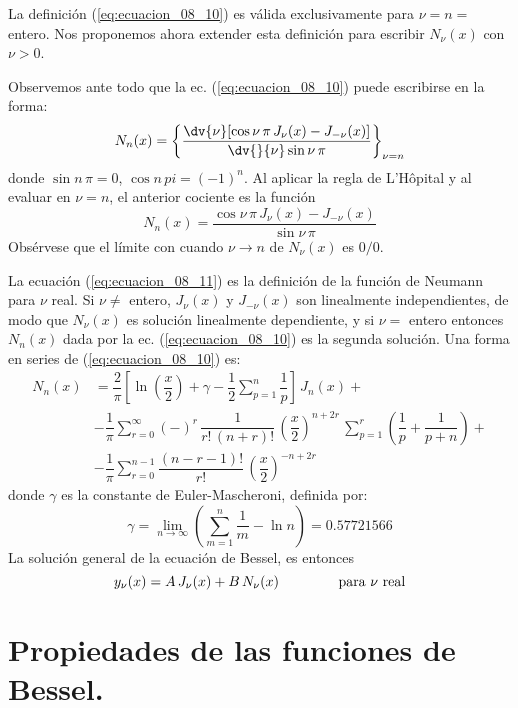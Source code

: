 La definición (\ref{eq:ecuacion_08_10}) es válida exclusivamente para $\nu = n =$ entero. Nos proponemos ahora extender esta definición para escribir $N_{\nu} (x)$ con $\nu > 0$.
\par
Observemos ante todo que la ec. (\ref{eq:ecuacion_08_10}) puede escribirse en la forma:
\[ N_{n} (x) =  \left\{  \dfrac{\dv{{\nu}} [\cos \nu \, \pi \, J_{\nu} (x) - J_{-\nu} (x)]}{\dv{}{\nu} \sin \nu \, \pi} \right\}_{\nu=n} \]
donde $\sin n \, \pi = 0$, $\cos n \, pi = (-1)^{n}$. Al aplicar la regla de L'Hôpital y al evaluar en $\nu = n$, el anterior cociente es la función
\begin{equation}
N_{n} (x) = \dfrac{\cos \nu \, \pi \, J_{\nu} (x) - J_{-\nu} (x)}{\sin \nu \, \pi}
\label{eq:ecuacion_08_11}
\end{equation}
Obsérvese que el límite con cuando $\nu \to n$ de $N_{\nu} (x)$ es $0/0$.
\par
La ecuación (\ref{eq:ecuacion_08_11}) es la definición de la función de Neumann para $\nu$ real. Si $\nu \neq$ entero, $J_{\nu} (x)$ y $J_{-\nu} (x)$ son linealmente independientes, de modo que $N_{\nu}(x)$ es solución linealmente dependiente, y si $\nu =$ entero entonces $N_{n}(x)$ dada por la ec. (\ref{eq:ecuacion_08_10}) es la segunda solución. Una forma en series de (\ref{eq:ecuacion_08_10}) es:
\begin{align*}
N_{n}(x) &= \dfrac{2}{\pi} \left[ \ln \left(\dfrac{x}{2} \right) + \gamma - \dfrac{1}{2} \sum_{p=1}^{n} \dfrac{1}{p} \right] \, J_{n} (x) + \\
&- \dfrac{1}{\pi} \sum_{r=0}^{\infty} (-)^{r} \, \dfrac{1}{r! \, (n + r)!} \, \left( \dfrac{x}{2} \right)^{n+2r} \, \sum_{p=1}^{r} \left( \dfrac{1}{p} + \dfrac{1}{p + n} \right) + \\
&- \dfrac{1}{\pi} \sum_{r=0}^{n-1} \dfrac{(n - r - 1)!}{r!} \, \left( \dfrac{x}{2} \right)^{-n+2r}
\end{align*}
donde $\gamma$ es la constante de Euler-Mascheroni, definida por:
\[ \gamma = \lim_{n \to \infty} \left( \sum_{m=1}^{n} \dfrac{1}{m} - \ln n \right) = 0.57721566 \]
La solución general de la ecuación de Bessel, es entonces
\[ y_{\nu} (x) = A \, J_{\nu} (x) + B \, N_{\nu} (x) \hspace{1.5cm} \mbox{para $\nu$ real} \]
\section{Propiedades de las funciones de Bessel.}
